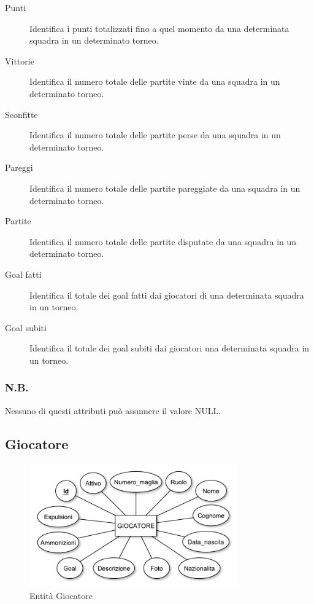 		\begin{description}
			
			\item[Punti]
			Identifica i punti totalizzati fino a quel momento da una determinata squadra in un determinato torneo.
			
			\item[Vittorie]
			Identifica il numero totale delle partite vinte da una squadra in un determinato torneo.
			
			\item[Sconfitte]
			Identifica il numero totale delle partite perse da una squadra in un determinato torneo.
			
			\item[Pareggi]
			Identifica il numero totale delle partite pareggiate da una squadra in un determinato torneo.
			
			\item[Partite]
			Identifica il numero totale delle partite disputate da una squadra in un determinato torneo.
			
			\item[Goal fatti]
			Identifica il totale dei goal fatti dai giocatori di una determinata squadra in un torneo.
			
			\item[Goal subiti]
			Identifica il totale dei goal subiti dai giocatori una determinata squadra in un torneo.
			
		\end{description}
		
		\subsubsection*{N.B.}
		Nessuno di questi attributi può assumere il valore NULL.
		
	\subsection{Giocatore}
	
		\begin{figure}[h]
			\centering
			\includegraphics[width=0.8\textwidth]
			{immagini/11-giocatore}
			
			\caption{Entità Giocatore}
			\label{entita-giocatore}
		\end{figure}
		
